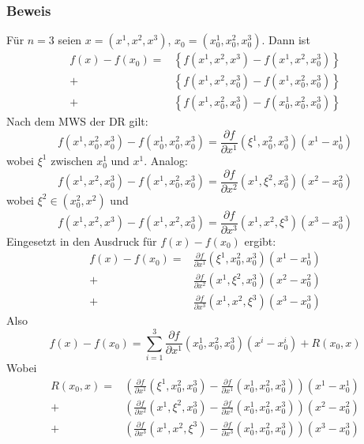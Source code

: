 \subsubsection*{Beweis}
Für $n=3$ seien $x=\left( x^1,x^2,x^3\right)$, $x_0=\left( x_0^1,x_0^2,x_0^3\right)$. Dann ist
\begin{align*}
f\left( x \right) - f\left( {{x_0}} \right) = &\left\{ {f\left( {{x^1},{x^2},{x^3}} \right) - f\left( {{x^1},{x^2},x_0^3} \right)} \right\}\\
+ &\left\{ {f\left( {{x^1},{x^2},x_0^3} \right) - f\left( {{x^1},x_0^2,x_0^3} \right)} \right\}\\
+ &\left\{ {f\left( {{x^1},x_0^2,x_0^3} \right) - f\left( {x_0^1,x_0^2,x_0^3} \right)} \right\}
\end{align*}
Nach dem MWS der DR gilt: \[f\left( {{x^1},x_0^2,x_0^3} \right) - f\left( {x_0^1,x_0^2,x_0^3} \right) = \frac{{\partial f}}{{\partial {x^1}}}\left( {{\xi ^1},x_0^2,x_0^3} \right)\left( x^1-x_0^1\right)\]
wobei $\xi^1$ zwischen $x_0^1$ und $x^1$. Analog:
\[f\left( {{x^1},{x^2},x_0^3} \right) - f\left( {{x^1},x_0^2,x_0^3} \right) = \frac{{\partial f}}{{\partial {x^2}}}\left( {{x^1},{\xi ^2},x_0^3} \right)\left( {{x^2} - x_0^2} \right)\] wobei $\xi^2\in\left(x_0^2,x^2\right)$
und \[f\left( {{x^1},{x^2},{x^3}} \right) - f\left( {{x^1},{x^2},x_0^3} \right) = \frac{{\partial f}}{{\partial {x^3}}}\left( {{x^1},{x^2},{\xi ^3}} \right)\left( {{x^3} - x_0^3} \right)\]
Eingesetzt in den Ausdruck für $f(x)-f(x_0)$ ergibt:
\begin{align*}
f\left( x \right) - f\left( {{x_0}} \right) = &\frac{{\partial f}}{{\partial {x^1}}}\left( {{\xi ^1},x_0^2,x_0^3} \right)\left( {{x^1} - x_0^1} \right)\\
+ &\frac{{\partial f}}{{\partial {x^2}}}\left( {{x^1},{\xi ^2},x_0^3} \right)\left( {{x^2} - x_0^2} \right)\\ + &\frac{{\partial f}}{{\partial {x^3}}}\left( {{x^1},{x^2},{\xi ^3}} \right)\left( {{x^3} - x_0^3} \right)
\end{align*}
Also
\[f\left( x \right) - f\left( {{x_0}} \right) = \sum\limits_{i = 1}^3 {\frac{{\partial f}}{{\partial {x^1}}}\left( {x_0^1,x_0^2,x_0^3} \right)\left( {{x^i} - x_0^i} \right)}  + R\left( {{x_0},x} \right)\]
Wobei
\begin{align*}
R\left( {{x_0},x} \right) = &\left( {\frac{{\partial f}}{{\partial {x^1}}}\left( {{\xi ^1},x_0^2,x_0^3} \right) - \frac{{\partial f}}{{\partial {x^1}}}\left( {x_0^1,x_0^2,x_0^3} \right)} \right)\left( {{x^1} - x_0^1} \right)\\
 + &\left( {\frac{{\partial f}}{{\partial {x^2}}}\left( {{x^1},{\xi ^2},x_0^3} \right) - \frac{{\partial f}}{{\partial {x^2}}}\left( {x_0^1,x_0^2,x_0^3} \right)} \right)\left( {{x^2} - x_0^2} \right)\\
 + &\left( {\frac{{\partial f}}{{\partial {x^3}}}\left( {{x^1},{x^2},{\xi ^3}} \right) - \frac{{\partial f}}{{\partial {x^3}}}\left( {x_0^1,x_0^2,x_0^3} \right)} \right)\left( {{x^3} - x_0^3} \right)
\end{align*}
